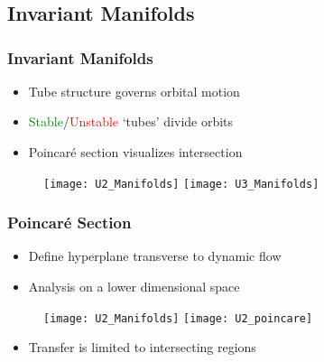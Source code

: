 \section*{}
\subsection*{Invariant Manifolds}

\begin{frame}%
\frametitle{Invariant Manifolds}
\begin{itemize}
	\item Tube structure governs orbital motion
	\item \textcolor{green}{Stable}/\textcolor{red}{Unstable} `tubes' divide orbits
	\item Poincar\'e section visualizes intersection
\end{itemize}
 \begin{figure}
     \centering
     \texttt{[image: U2\_Manifolds]}%
     \texttt{[image: U3\_Manifolds]}
\end{figure}

\end{frame}%

\begin{frame}[t]%
\frametitle{Poincar\'e Section}
	\begin{itemize}
		\item Define hyperplane transverse to dynamic flow
		\item Analysis on a lower dimensional space
	\end{itemize}
 \begin{figure}
     \centering
     \texttt{[image: U2\_Manifolds]}%
     \texttt{[image: U2\_poincare]}
\end{figure}

	\pause
	\begin{itemize}
		\item Transfer is limited to intersecting regions
	\end{itemize}
	
\end{frame}%

